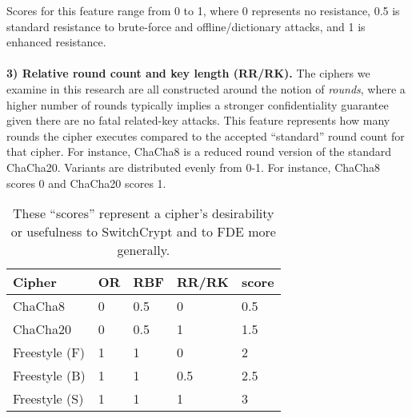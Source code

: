 Scores for this feature range from 0 to 1, where 0 represents no resistance, 0.5
is standard resistance to brute-force and offline/dictionary attacks,
and 1 is enhanced resistance. \\
\\
\textbf{3) Relative round count and key length (RR/RK).} The ciphers we examine
in this research are all constructed around the notion of \emph{rounds}, where a
higher number of rounds typically implies a stronger confidentiality guarantee
given there are no fatal related-key attacks. This feature represents how many
rounds the cipher executes compared to the accepted ``standard'' round count for
that cipher. For instance, ChaCha8 is a reduced round version of the standard
ChaCha20. Variants are distributed evenly from 0-1. For instance, ChaCha8 scores
0 and ChaCha20 scores 1\@.

\begin{table}[]
  \begin{tabular}{@{}lllll@{}}
  \toprule
  \textbf{Cipher} & \textbf{OR} & \textbf{RBF} & \textbf{RR/RK} & \textbf{score} \\ \midrule
  ChaCha8         & 0           & 0.5          & 0              & 0.5            \\
  ChaCha20        & 0           & 0.5          & 1              & 1.5            \\
  Freestyle (F)   & 1           & 1            & 0              & 2              \\
  Freestyle (B)   & 1           & 1            & 0.5            & 2.5            \\
  Freestyle (S)   & 1           & 1            & 1              & 3
  \end{tabular}
  \caption{These ``scores'' represent a cipher's desirability or usefulness to
  SwitchCrypt and to FDE more generally.}
  \label{tbl:security-quant}
\end{table}
